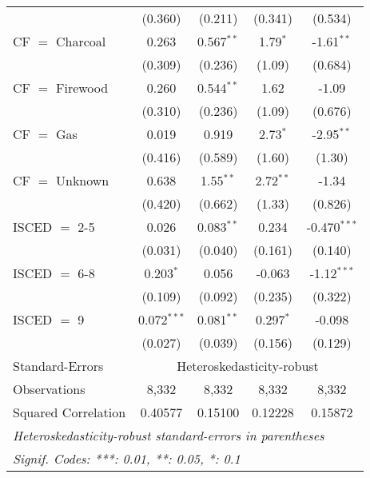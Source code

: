 \begin{table}[htbp!]
\begin{adjustbox}{width = 1\textwidth, max height = 0.95\textheight, center}
\begin{threeparttable}[b]
\begin{tabular}{lcccc}
                                 & (0.360)            & (0.211)            & (0.341)       & (0.534)\\   
            CF $=$ Charcoal      & 0.263              & 0.567$^{**}$       & 1.79$^{*}$    & -1.61$^{**}$\\   
                                 & (0.309)            & (0.236)            & (1.09)        & (0.684)\\   
            CF $=$ Firewood      & 0.260              & 0.544$^{**}$       & 1.62          & -1.09\\   
                                 & (0.310)            & (0.236)            & (1.09)        & (0.676)\\   
            CF $=$ Gas           & 0.019              & 0.919              & 2.73$^{*}$    & -2.95$^{**}$\\   
                                 & (0.416)            & (0.589)            & (1.60)        & (1.30)\\   
            CF $=$ Unknown       & 0.638              & 1.55$^{**}$        & 2.72$^{**}$   & -1.34\\   
                                 & (0.420)            & (0.662)            & (1.33)        & (0.826)\\   
            ISCED $=$ 2-5        & 0.026              & 0.083$^{**}$       & 0.234         & -0.470$^{***}$\\   
                                 & (0.031)            & (0.040)            & (0.161)       & (0.140)\\   
            ISCED $=$ 6-8        & 0.203$^{*}$        & 0.056              & -0.063        & -1.12$^{***}$\\   
                                 & (0.109)            & (0.092)            & (0.235)       & (0.322)\\   
            ISCED $=$ 9          & 0.072$^{***}$      & 0.081$^{**}$       & 0.297$^{*}$   & -0.098\\   
                                 & (0.027)            & (0.039)            & (0.156)       & (0.129)\\   
            \midrule 
            Standard-Errors & \multicolumn{4}{c}{Heteroskedasticity-robust} \\ 
            Observations         & 8,332              & 8,332              & 8,332         & 8,332\\  
            Squared Correlation  & 0.40577            & 0.15100            & 0.12228       & 0.15872\\  
            \midrule \midrule
            \multicolumn{5}{l}{\emph{Heteroskedasticity-robust standard-errors in parentheses}}\\
            \multicolumn{5}{l}{\emph{Signif. Codes: ***: 0.01, **: 0.05, *: 0.1}}\\
         \end{tabular}
         

\end{threeparttable}
\end{adjustbox}
\end{table}
